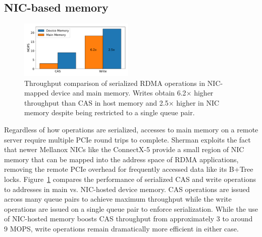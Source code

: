 
\subsection{NIC-based memory}

\begin{figure}[t]
  \includegraphics[width=0.485\textwidth]{fig/cas_vs_writes.pdf}

  \caption{ Throughput comparison of serialized RDMA operations in
    NIC-mapped device and main memory. Writes obtain 6.2$\times$ higher
    throughput than CAS in host memory and 2.5$\times$ higher in NIC memory despite being restricted to a single queue pair.  }

    \label{fig:cas_vs_writes}
\end{figure}

Regardless of how operations are serialized,
accesses to main memory on a remote server require multiple PCIe
round trips to
complete.
Sherman exploits the fact that newer Mellanox NICs like the ConnectX-5
provide a small region of NIC memory that can be mapped into the
address space of RDMA applications,
removing the remote PCIe overhead for frequently accessed data like its B+Tree locks.
Figure~\ref{fig:cas_vs_writes} compares the performance of
serialized CAS and write operations to addresses in main vs.
NIC-hosted device memory. CAS operations are issued across many
queue pairs to achieve maximum throughput while the write operations are
issued on a single queue pair to enforce serialization.
While the use of NIC-hosted memory boosts CAS throughput
from approximately 3 to around 9 MOPS, write operations remain
dramatically more efficient in either case.


